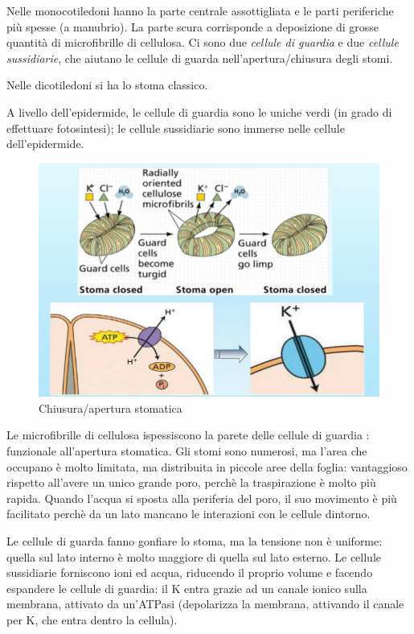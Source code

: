 \documentclass[a4paper,12pt]{book}
\begin{document}
Nelle monocotiledoni hanno la parte centrale assottigliata e le parti periferiche più spesse (a manubrio). La parte scura corrisponde a deposizione di grosse quantità di microfibrille di cellulosa. Ci sono due \emph{cellule di guardia} e due \emph{cellule sussidiarie}, che aiutano le cellule di guarda nell'apertura/chiusura degli stomi.

Nelle dicotiledoni si ha lo stoma classico.

A livello dell'epidermide, le cellule di guardia sono le uniche verdi (in grado di effettuare fotosintesi); le cellule sussidiarie sono immerse nelle cellule dell'epidermide.
\begin{figure}[H]
\centering
\includegraphics[scale=0.5]{immagini/chiusura.jpg}
\caption{Chiusura/apertura stomatica}
\end{figure}
 
Le microfibrille di cellulosa ispessiscono la parete delle cellule di guardia : funzionale all'apertura stomatica.
Gli stomi sono numerosi, ma l'area che occupano è molto limitata, ma distribuita in piccole aree della foglia: vantaggioso rispetto all'avere un unico grande poro, perchè la traspirazione è molto più rapida. Quando l'acqua si sposta alla periferia del poro, il suo movimento è più facilitato perchè da un lato mancano le interazioni con le cellule dintorno. 

Le cellule di guarda fanno gonfiare lo stoma, ma la tensione non è uniforme: quella sul lato interno è molto maggiore di quella sul lato esterno.
Le cellule sussidiarie forniscono ioni ed acqua, riducendo il proprio volume e facendo espandere le cellule di guardia: il K entra grazie ad un canale ionico sulla membrana, attivato da un'ATPasi (depolarizza la membrana, attivando il canale per K, che entra dentro la cellula).	
\end{document}
